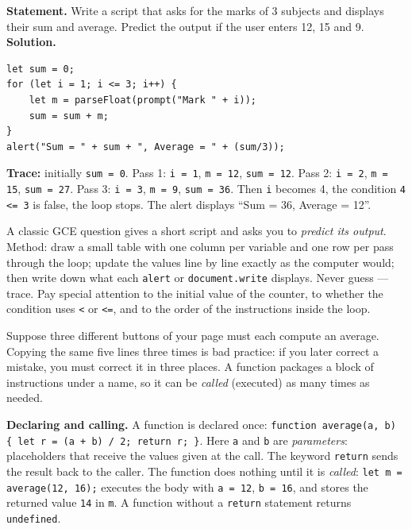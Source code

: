 \documentclass[11pt]{article}
\newcommand{\cle}[1]{{\popxbold\color{popdark}#1}}
\newcounter{popsec}
\newcounter{popsub}
\newcommand{\courssub}[1]{%
  \stepcounter{popsub}%
  \par\vspace{9pt}\noindent{\popxbold\fontsize{11.5}{13}\selectfont\color{popink}{\color{poporange}\thepopsec.\thepopsub}\hspace{6pt}#1}\par\nopagebreak\vspace{4pt}
}
\begin{document}
\begin{exoresolu}
\textbf{Statement.} Write a script that asks for the marks of 3 subjects and displays their sum and average. Predict the output if the user enters 12, 15 and 9.
\tcblower
\textbf{Solution.}
\begin{verbatim}
let sum = 0;
for (let i = 1; i <= 3; i++) {
    let m = parseFloat(prompt("Mark " + i));
    sum = sum + m;
}
alert("Sum = " + sum + ", Average = " + (sum/3));
\end{verbatim}
\textbf{Trace:} initially \texttt{sum = 0}. Pass 1: \texttt{i = 1}, \texttt{m = 12}, \texttt{sum = 12}. Pass 2: \texttt{i = 2}, \texttt{m = 15}, \texttt{sum = 27}. Pass 3: \texttt{i = 3}, \texttt{m = 9}, \texttt{sum = 36}. Then \texttt{i} becomes 4, the condition \texttt{4 <= 3} is false, the loop stops. The alert displays ``Sum = 36, Average = 12''.
\end{exoresolu}

\begin{aretenir}
A classic GCE question gives a short script and asks you to \emph{predict its output}. Method: draw a small table with one column per variable and one row per pass through the loop; update the values line by line exactly as the computer would; then write down what each \texttt{alert} or \texttt{document.write} displays. Never guess --- trace. Pay special attention to the initial value of the counter, to whether the condition uses \texttt{<} or \texttt{<=}, and to the order of the instructions inside the loop.
\end{aretenir}

\courssub{Functions: Avoiding Repetition}

Suppose three different buttons of your page must each compute an average. Copying the same five lines three times is bad practice: if you later correct a mistake, you must correct it in three places. A \cle{function} packages a block of instructions under a name, so it can be \emph{called} (executed) as many times as needed.

\textbf{Declaring and calling.} A function is declared once:
\texttt{function average(a, b) \{ let r = (a + b) / 2; return r; \}}. Here \texttt{a} and \texttt{b} are \emph{parameters}: placeholders that receive the values given at the call. The keyword \texttt{return} sends the result back to the caller. The function does nothing until it is \emph{called}: \texttt{let m = average(12, 16);} executes the body with \texttt{a = 12}, \texttt{b = 16}, and stores the returned value \texttt{14} in \texttt{m}. A function without a \texttt{return} statement returns \texttt{undefined}.
\end{document}
